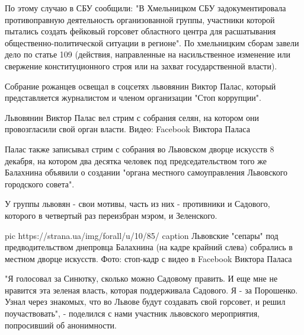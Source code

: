 По этому случаю в СБУ сообщили: "В Хмельницком СБУ задокументировала
противоправную деятельность организованной группы, участники которой
пытались создать фейковый горсовет областного центра для расшатывания
общественно-политической ситуации в регионе". По хмельницким сборам завели
дело по статье 109 (действия, направленные на насильственное изменение или
свержение конституционного строя или на захват государственной власти).

Собрание рожанцев освещал в соцсетях львовянин Виктор Палас, который
представляется журналистом и членом организации "Стоп коррупции".  


Львовянин Виктор Палас вел стрим с собрания селян, на котором они провозгласили
свой орган власти. Видео: Facebook Виктора Паласа

Палас также записывал стрим с собрания во Львовском дворце искусств 8
декабря, на котором два десятка человек под председательством того же
Балахнина объявили о создании "органа местного самоуправления Львовского
городского совета".

У группы львовян - свои мотивы, часть из них - противники и Садового,
которого в четвертый раз переизбран мэром, и Зеленского. 

\ifcmt
pic https://strana.ua/img/forall/u/10/85/%
caption Львовские "сепары" под предводительством днепровца Балахнина (на кадре крайний слева) собрались в местном дворце искусств. Фото: стоп-кадр с видео в Facebook Виктора Паласа
\fi


"Я голосовал за Синютку, сколько можно Садовому править. И еще мне не
нравится эта зеленая власть, которая поддерживала Садового. Я - за
Порошенко. Узнал через знакомых, что во Львове будут создавать свой
горсовет, и решил поучаствовать", - поделился с нами участник львовского
мероприятия, попросивший об анонимности.  
